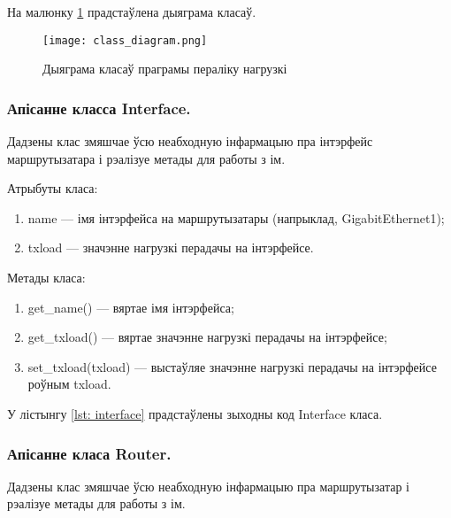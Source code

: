 На малюнку \ref{uml: Class Diagram} прадстаўлена дыяграма класаў.

\clearpage

\begin{figure}[ht!]
    \centering
    \texttt{[image: class\_diagram.png]}
    \caption{Дыяграма класаў праграмы пераліку нагрузкі}
    \label{uml: Class Diagram}
\end{figure}

\vspace{-\baselineskip}

\subsubsection{Апісанне класса Interface.}

Дадзены клас змяшчае ўсю неабходную інфармацыю пра інтэрфейс маршрутызатара і
рэалізуе метады для работы з ім.

Атрыбуты класа:
\begin{enumerate}
    \item name --- імя інтэрфейса на маршрутызатары (напрыклад, GigabitEthernet1);
    \item txload --- значэнне нагрузкі перадачы на інтэрфейсе.
\end{enumerate}

Метады класа:
\begin{enumerate}
    \item get\_name() --- вяртае імя інтэрфейса;
    \item get\_txload() --- вяртае значэнне нагрузкі перадачы на інтэрфейсе;
    \item set\_txload(txload) --- выстаўляе значэнне нагрузкі перадачы на інтэрфейсе
    роўным txload.
\end{enumerate}

У лістынгу \ref{lst: interface} прадстаўлены зыходны код Interface класа.



\vspace{-\baselineskip}

\subsubsection{Апісанне класа Router.}

Дадзены клас змяшчае ўсю неабходную інфармацыю пра маршрутызатар і рэалізуе
метады для работы з ім.


